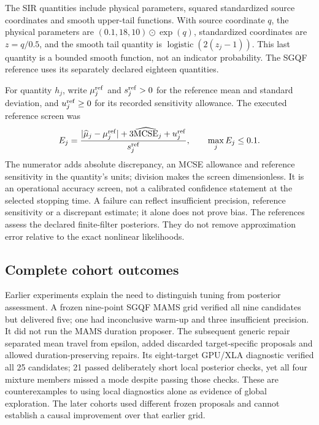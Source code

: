 The SIR quantities include physical parameters, squared standardized source
coordinates and smooth upper-tail functions. With source coordinate $q$,
the physical parameters are
$(0.1,18,10)\odot\exp(q)$, standardized coordinates are $z=q/0.5$, and the
smooth tail quantity is $\operatorname{logistic}(2(z_j-1))$. This last
quantity is a bounded smooth function, not an indicator probability. The
SGQF reference uses its separately declared eighteen quantities.

For quantity $h_j$, write $\mu_j^{\rm ref}$ and $s_j^{\rm ref}>0$ for the
reference mean and standard deviation, and $u_j^{\rm ref}\geq0$ for its
recorded sensitivity allowance. The executed reference screen was
\begin{equation}
 E_j=\frac{|\widehat\mu_j-\mu_j^{\rm ref}|
             +3\widehat{\rm MCSE}_j+u_j^{\rm ref}}{s_j^{\rm ref}},
 \qquad \max_j E_j\leq0.1.
 \label{eq:bf-modern-reference-screen}
\end{equation}
The numerator adds absolute discrepancy, an MCSE allowance and reference
sensitivity in the quantity's units; division makes the screen dimensionless.
It is an operational accuracy screen, not a calibrated confidence statement
at the selected stopping time. A failure can reflect insufficient precision,
reference sensitivity or a discrepant estimate; it alone does not prove bias.
The references assess the declared finite-filter posteriors. They do not
remove approximation error relative to the exact nonlinear likelihoods.

\subsection{Complete cohort outcomes}

Earlier experiments explain the need to distinguish tuning from posterior
assessment. A frozen nine-point SGQF MAMS grid verified all nine candidates
but delivered five; one had inconclusive warm-up and three insufficient
precision. It did not run the MAMS duration proposer. The subsequent generic
repair separated mean travel from epsilon, added discarded target-specific
proposals and allowed duration-preserving repairs. Its eight-target GPU/XLA
diagnostic verified all 25 candidates; 21 passed deliberately short local
posterior checks, yet all four mixture members missed a mode despite passing
those checks. These are counterexamples to using local diagnostics alone as
evidence of global exploration. The later cohorts used different frozen
proposals and cannot establish a causal improvement over that earlier grid.

